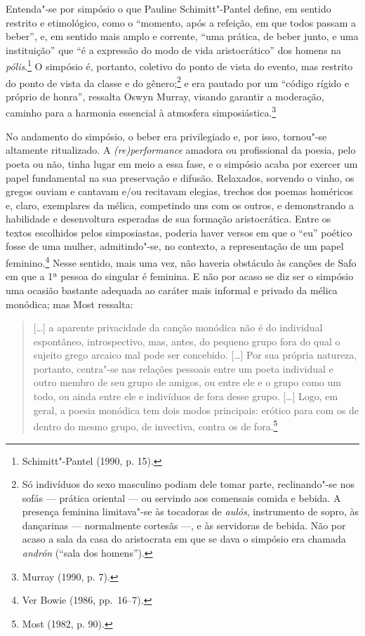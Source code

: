 Entenda"-se por simpósio o que Pauline Schimitt"-Pantel define, em
sentido restrito e etimológico, como o “momento, após a refeição, em que todos
passam a beber”, e, em sentido mais amplo e corrente, “uma prática, de beber
junto, e uma instituição” que “é a expressão do modo de vida aristocrático” dos
homens na \textit{pólis}.\footnote{ Schimitt"-Pantel (1990, p. 15).} O simpósio
é, portanto, coletivo do ponto de vista do
evento, mas restrito do ponto de vista da classe e do gênero;\footnote{ Só
indivíduos do sexo masculino podiam dele tomar parte, reclinando"-se nos sofás ---
prática oriental --- ou servindo aos comensais comida e bebida. A presença
feminina limitava"-se às tocadoras de \textit{aulós}, instrumento de sopro, às
dançarinas --- normalmente cortesãs ---, e às servidoras de bebida. Não por acaso a
sala da casa do aristocrata em que se dava o simpósio era chamada
\textit{andrón} (“sala dos homens”).} e era pautado por um
“código rígido e próprio de honra”, ressalta Oswyn Murray, visando
garantir a moderação, caminho para a harmonia essencial à atmosfera
simposiástica.\footnote{ Murray (1990, p. 7).}

No andamento do simpósio, o beber era privilegiado e, por isso, tornou"-se
altamente ritualizado. A \textit{(re)performance} amadora ou profissional da
poesia, pelo poeta ou não, tinha lugar em meio a essa fase, e o simpósio acaba
por exercer um papel fundamental na sua preservação e difusão. Relaxados,
sorvendo o vinho, os gregos ouviam e cantavam e/ou recitavam elegias, trechos
dos poemas homéricos e, claro, exemplares da mélica, competindo uns com os
outros, e demonstrando a habilidade e desenvoltura esperadas de sua formação
aristocrática. Entre os textos escolhidos pelos simposiastas, poderia haver
versos em que o “eu” poético fosse de uma mulher, admitindo"-se, no contexto, a
representação de um papel feminino.\footnote{ Ver Bowie (1986, pp.~16--7).}
Nesse sentido, mais uma vez, não haveria obstáculo às canções de Safo em que a
1ª pessoa do singular é feminina. E não por acaso se diz ser o simpósio uma
ocasião bastante adequada ao caráter mais informal e privado da mélica
monódica; mas Most ressalta:

\begin{quote}
\mbox[\ldots{}] a aparente privacidade da canção monódica não é do individual espontâneo,
introspectivo, mas, antes, do pequeno grupo fora do qual o sujeito grego
arcaico mal pode ser concebido. [\ldots{}] Por sua própria natureza, portanto,
centra"-se nas relações pessoais entre um poeta individual e outro membro de seu
grupo de amigos, ou entre ele e o grupo como um todo, ou ainda entre ele e
indivíduos de fora desse grupo. [\ldots{}] Logo, em geral, a poesia monódica tem
dois modos principais: erótico para com os de dentro do mesmo grupo, de
invectiva, contra os de fora.\footnote{ Most (1982, p. 90).}
\end{quote}

